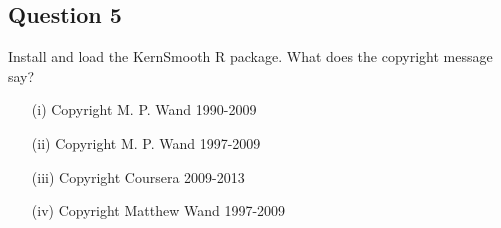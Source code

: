 \documentclass[12pt]{article}
\begin{document}
\subsection{Question 5}
Install and load the KernSmooth R package. What does the copyright message say?
\begin{itemize}
\item[(i)] Copyright M. P. Wand 1990-2009
\item[(ii)] Copyright M. P. Wand 1997-2009
\item[(iii)] Copyright Coursera 2009-2013
\item[(iv)] Copyright Matthew Wand 1997-2009
\end{itemize}

\newpage
\end{document}
